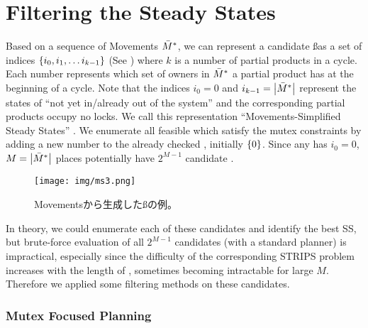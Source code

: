 \section{Filtering the Steady States}
\label{sec:filtering}

Based on a sequence of Movements $\bar{M}^*$, we can represent a candidate \ss as
a set of indices $\left\{i_0,i_1,\ldots i_{k-1}\right\}$ (See ) where
$k$ is a number of partial products in a cycle.
Each number represents which set of owners in $\bar{M}^*$ a partial product has
at the beginning of a cycle.
Note that the indices $i_0=0$ and $i_{k-1}=\left|\bar{M}^*\right|$ represent
the states of ``not yet in/already out of the system'' and
the corresponding partial products occupy no locks.
We call this representation ``Movements-Simplified Steady States'' \msss .
We enumerate all feasible \msss which satisfy the mutex constraints
by adding a new number to the already checked \msss , initially $\left\{0\right\}$.
Since any \msss has $i_0=0$,
$M=\left|\bar{M}^*\right|$ places potentially have $2^{M-1}$ candidate \sss.

\begin{figure}
 \centering
 \texttt{[image: img/ms3.png]}
 \caption{Movementsから生成した\ss の例。}
 \label{movements-ss}
\end{figure}

In theory, we could enumerate each of these candidates and identify
the best SS, but brute-force evaluation of all $2^{M-1}$  candidates
(with a standard planner) is impractical, especially since the difficulty of the corresponding STRIPS problem increases with the length of \msss, sometimes becoming intractable for large $M$.
Therefore we applied some filtering methods on these candidates.

\subsubsection{Mutex Focused Planning}
\label{sec-2-4-1}

